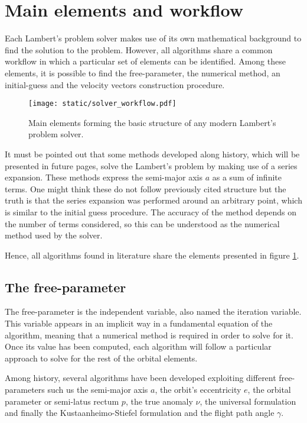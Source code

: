 \section{Main elements and workflow}

Each Lambert's problem solver makes use of its own mathematical background to
find the solution to the problem. However, all algorithms share a common
workflow in which a particular set of elements can be identified. Among these
elements, it is possible to find the free-parameter, the numerical method, an
initial-guess and the velocity vectors construction procedure.

\vspace{0.5cm}
\begin{figure}[h]
  \centering
  \texttt{[image: static/solver\_workflow.pdf]}
  \caption[Basic solver elements and structure]{Main elements forming the basic structure of any modern Lambert's
    problem solver.}
  \label{fig:solver_elements}
\end{figure}

It must be pointed out that some methods developed along history, which will be
presented in future pages, solve the Lambert's problem by making use of a series
expansion. These methods express the semi-major axis $a$ as a sum of infinite
terms. One might think these do not follow previously cited structure but the
truth is that the series expansion was performed around an arbitrary point,
which is similar to the initial guess procedure. The accuracy of the method
depends on the number of terms considered, so this can be understood as the
numerical method used by the solver.

Hence, all algorithms found in literature share the elements presented in figure
\ref{fig:solver_elements}.

\subsection{The free-parameter}

The free-parameter is the independent variable, also named the iteration
variable. This variable appears in an implicit way in a fundamental equation of
the algorithm, meaning that a numerical method is required in order to solve for
it. Once its value has been computed, each algorithm will follow a particular
approach to solve for the rest of the orbital elements.

Among history, several algorithms have been developed exploiting different
free-parameters such us the semi-major axis $a$, the orbit's eccentricity $e$,
the orbital parameter or semi-latus rectum $p$, the true anomaly $\nu$, the
universal formulation and finally the Kustaanheimo-Stiefel formulation and the
flight path angle $\gamma$.

